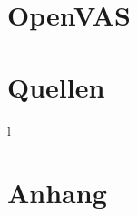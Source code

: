 \documentclass[12pt]{article}
\theoremstyle{plain}
\begin{document}
\subsection{}
\subsection{}
\subsection{}
\subsection{}
\section{OpenVAS}
\subsection{}
\subsection{}
\subsection{}
\subsection{}
\subsection{}
\subsection{}
\section{Quellen}
l
\section{Anhang}
\end{document}
